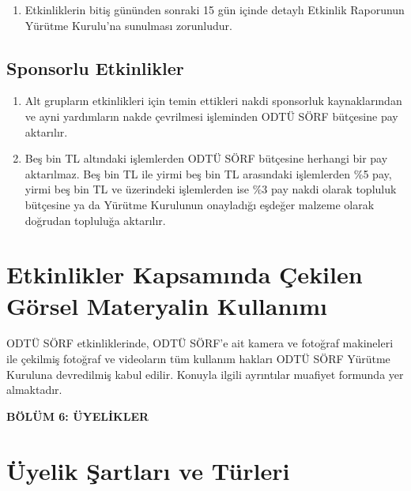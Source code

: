 \documentclass[11pt,a4paper]{article}
\begin{document}
\begin{enumerate}
    \begin{itemize}
        \item Teknik Sorumlu, eğitim ve saha çalışmalarının güvenli, verimli ve disiplin kurallarına uygun yürütülmesini denetler. 
        \item Malzeme Sorumlusu, etkinlikte kullanılacak demirbaşların zimmetlenmesi, sağlamlığı, nakliyesi ve hasar takibinden sorumludur.
    \end{itemize}
    \item Etkinliklerin bitiş gününden sonraki 15 gün içinde detaylı Etkinlik Raporunun Yürütme Kurulu'na sunulması zorunludur.
\end{enumerate}

\subsection{Sponsorlu Etkinlikler}
\begin{enumerate}
    \item Alt grupların etkinlikleri için temin ettikleri nakdi sponsorluk kaynaklarından ve ayni yardımların nakde çevrilmesi işleminden ODTÜ SÖRF bütçesine pay aktarılır.
    \item Beş bin TL altındaki işlemlerden ODTÜ SÖRF bütçesine herhangi bir pay aktarılmaz. Beş bin TL ile yirmi beş bin TL arasındaki işlemlerden \%5 pay, yirmi beş bin TL ve üzerindeki işlemlerden ise \%3 pay nakdi olarak topluluk bütçesine ya da Yürütme Kurulunun onayladığı eşdeğer malzeme olarak doğrudan topluluğa aktarılır.
\end{enumerate}

\section{Etkinlikler Kapsamında Çekilen Görsel Materyalin Kullanımı}
ODTÜ SÖRF etkinliklerinde, ODTÜ SÖRF'e ait kamera ve fotoğraf makineleri ile çekilmiş fotoğraf ve videoların tüm kullanım hakları ODTÜ SÖRF Yürütme Kuruluna devredilmiş kabul edilir. Konuyla ilgili ayrıntılar muafiyet formunda yer almaktadır.

\begin{center}
    {\Large \textbf{BÖLÜM 6: ÜYELİKLER}}
\end{center}
\vspace{0.5cm}

\section{Üyelik Şartları ve Türleri}
\end{document}
